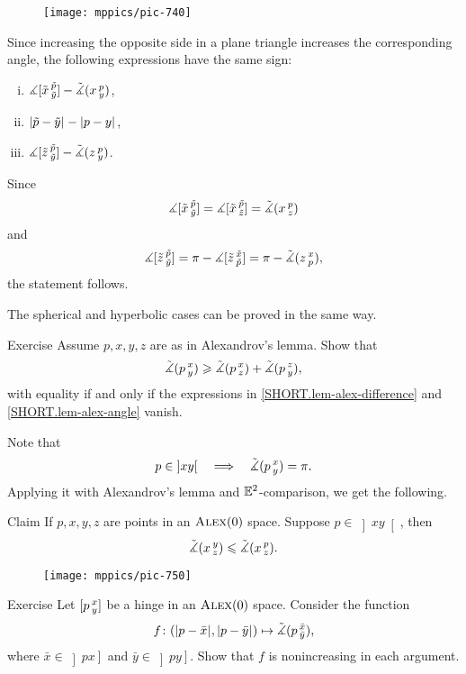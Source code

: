 \begin{wrapfigure}{r}{33mm}
\vskip-0mm
\centering
\texttt{[image: mppics/pic-740]}
\end{wrapfigure}

Since increasing the opposite side in a plane triangle increases the corresponding angle, 
the following expressions have the same sign:
\begin{enumerate}[(i)]
\item $\measuredangle[\tilde x\,{}^{\tilde p}_{\tilde y}]-\tilde\measuredangle(x\,{}^{p}_{y})$,
\item $\dist{\tilde p}{\tilde y}{}-\dist{p}{y}{}$,
\item $\measuredangle[\tilde z\,{}^{\tilde p}_{\tilde y}]-\tilde\measuredangle(z\,{}^{p}_{y})$.
\end{enumerate}
Since 
\[\measuredangle[\tilde x\,{}^{\tilde p}_{\tilde y}]=\measuredangle[\tilde x\,{}^{\tilde p}_{\tilde z}]=\tilde\measuredangle(x\,{}^{p}_{z})\]
and
\[ \measuredangle[\tilde z\,{}^{\tilde p}_{\tilde y}]
=\pi-\measuredangle[\tilde z\,{}^{\tilde x}_{\tilde p}]
=\pi-\tilde\measuredangle(z\,{}^{x}_{p}),\]
the statement follows.


The spherical and hyperbolic cases can be proved in the same way.
\qeds

\begin{thm}{Exercise}\label{ex:alex-lemma-cat}
Assume $p,x,y,z$ are as in Alexandrov's lemma.
Show that
\[\tilde\measuredangle(p\,{}^{x}_{y})
\geqslant
\tilde\measuredangle(p\,{}^{x}_{z}) + \tilde\measuredangle(p\,{}^{z}_{y}),\]
with equality if and only if the expressions in \ref{SHORT.lem-alex-difference} and \ref{SHORT.lem-alex-angle} vanish.
\end{thm}

Note that 
\[p\in\left]x y\right[
\quad\Longrightarrow\quad
\tilde\measuredangle(p\,{}^{x}_{y})=\pi.
\]
Applying it with Alexandrov's lemma and $\mathbb{E}^2$-comparison, we get the following.

\begin{thm}{Claim}\label{clm:angle-mono}
If $p,x,y,z$ are points in an $\textsc{Alex}(0)$ space.
Suppose $p\in\left]x y\right[$, then 
\[\tilde\measuredangle(x\,{}^{y}_{z})\leqslant \tilde\measuredangle(x\,{}^{p}_{z}).\]
\end{thm}

\begin{wrapfigure}{r}{25mm}
\vskip-0mm
\centering
\texttt{[image: mppics/pic-750]}
\end{wrapfigure}

\begin{thm}{Exercise}\label{ex:noncreasing}
Let $[p\,{}^{x}_{y}]$ be a hinge in an $\textsc{Alex}(0)$ space.
Consider the function
\[f\:(\dist{p}{\bar x}{},\dist{p}{\bar y}{})\mapsto \angk p{\bar x}{\bar y},\]
where $\bar x\in\left]p x\right]$ and $\bar y\in\left]p y\right]$.
Show that $f$ is nonincreasing in each argument.
\end{thm}

